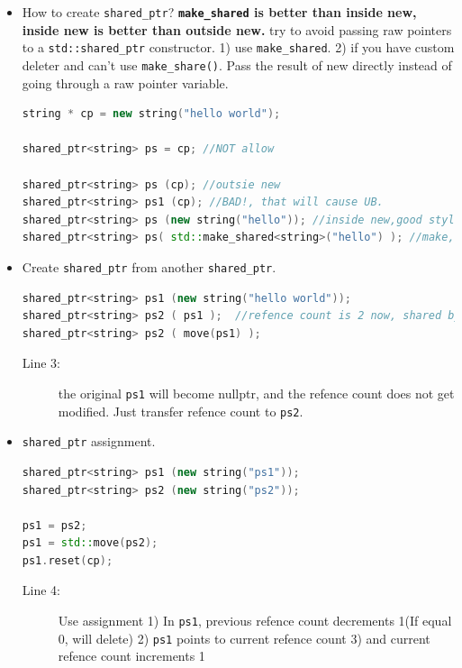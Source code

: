 \documentclass[a4paper,11pt,twoside]{book}
\begin{document}
\begin{itemize}
\begin{enumerate}
\end{enumerate}

	
    \item How to create \texttt{shared\_ptr}? \textbf{\texttt{make\_shared} is better than inside new, inside new is better than outside new.} try to avoid passing raw pointers to a \texttt{std::shared\_ptr} constructor. 1) use \texttt{make\_shared}. 2) if you have custom deleter and can't use \texttt{make\_share()}.  Pass the result of new directly instead of going through a raw pointer variable.
\begin{lstlisting}[frame=single, language=c++]
string * cp = new string("hello world");

shared_ptr<string> ps = cp; //NOT allow

shared_ptr<string> ps (cp); //outsie new 
shared_ptr<string> ps1 (cp); //BAD!, that will cause UB.
shared_ptr<string> ps (new string("hello")); //inside new,good style
shared_ptr<string> ps( std::make_shared<string>("hello") ); //make, best style
\end{lstlisting}

	\item Create \texttt{shared\_ptr} from another \texttt{shared\_ptr}.
\begin{lstlisting}[frame=single, language=c++, mathescape=true]
shared_ptr<string> ps1 (new string("hello world"));
shared_ptr<string> ps2 ( ps1 );  //refence count is 2 now, shared by ps1 and ps2
shared_ptr<string> ps2 ( move(ps1) );
\end{lstlisting}
\begin{description}
	\item[Line 3:] the original \texttt{ps1} will become nullptr, and the  refence count does not get modified. Just transfer refence count to \texttt{ps2}. 
\end{description}

    \item \texttt{shared\_ptr} assignment.
\begin{lstlisting}[frame=single, language=c++, mathescape=true]
shared_ptr<string> ps1 (new string("ps1"));
shared_ptr<string> ps2 (new string("ps2"));

ps1 = ps2;
ps1 = std::move(ps2);
ps1.reset(cp); 
\end{lstlisting}
\begin{description}
	\item[Line 4:] Use assignment  1) In \texttt{ps1}, previous refence count decrements 1(If equal 0, will delete) 2) \texttt{ps1} points to current refence count 3) and current refence count increments 1
	

\end{description}
\end{itemize}
\end{document}

